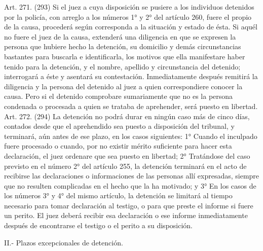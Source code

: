     Art. 271. (293) Si el juez a cuya disposición se pusiere a los individuos detenidos por la policía, con arreglo a los números 1° y 2° del artículo 260, fuere el propio de la causa, procederá según corresponda a la situación y estado de ésta.
    Si aquél no fuere el juez de la causa, extenderá una diligencia en que se expresen la persona que hubiere hecho la detención, su domicilio y demás circunstancias bastantes para buscarla e identificarla, los motivos que ella manifestare haber tenido para la detención, y el nombre, apellido y circunstancia del detenido; interrogará a éste y asentará su contestación.
    Inmediatamente después remitirá la diligencia y la persona del detenido al juez a quien correspondiere conocer la causa.
    Pero si el detenido comprobare sumariamente que no es la persona condenada o procesada a quien se trataba de aprehender, será puesto en libertad.
    Art. 272. (294) La detención no podrá durar en ningún caso más de cinco días, contados desde que el aprehendido sea puesto a disposición del tribunal, y terminará, aún antes de ese plazo, en los casos siguientes:
    1° Cuando el inculpado fuere procesado o cuando, por no existir mérito suficiente para hacer esta declaración, el juez ordenare que sea puesto en libertad;
    2° Tratándose del caso previsto en el número 2° del artículo 255, la detención terminará en el acto de recibirse las declaraciones o informaciones de las personas allí expresadas, siempre que no resulten complicadas en el hecho que la ha motivado; y
    3° En los casos de los números 3° y 4° del mismo artículo, la detención se limitará al tiempo necesario para tomar declaración al testigo, o para que preste el informe si fuere un perito.
    El juez deberá recibir esa declaración o ese informe inmediatamente después de encontrarse el testigo o el perito a su disposición.

  II.- Plazos excepcionales de detención.

